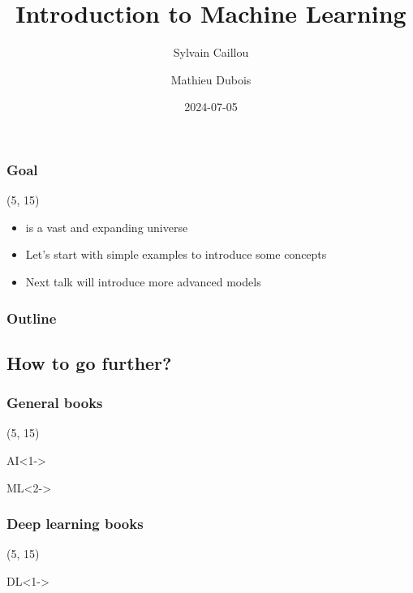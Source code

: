 \documentclass[10pt]{beamer}
\title{Introduction to Machine Learning}
\author{Sylvain Caillou \and Mathieu Dubois}
\institute{L2IT}
\date{2024-07-05}
\begin{document}
\frame{\titlepage}

\begin{frame}
  \frametitle{Goal}

  \begin{textblock}{90}(5, 15)
    \begin{itemize}
    \item {} is a vast and expanding universe
    \item Let's start with simple examples to introduce some concepts
    \item Next talk will introduce more advanced models
    \end{itemize}
  \end{textblock}
\end{frame}


\begin{frame}
  \frametitle{Outline}
  \tableofcontents[hidesubsections]
\end{frame}


\subsection*{How to go further?}

\begin{frame}
  \frametitle{General books}

  \nocite{*}

  \begin{textblock}{90}(5, 15)
    \begin{block}{AI}<1->
      \printbibliography[heading=none,category=AI]
    \end{block}

    \begin{block}{\ac{ML}}<2->
      \printbibliography[heading=none,category=ML]
    \end{block}
  \end{textblock}
\end{frame}

\begin{frame}
  \frametitle{Deep learning books}

  \nocite{*}

  \begin{textblock}{90}(5, 15)
    \begin{block}{DL}<1->
      \printbibliography[heading=none,category=deep_learning]
    \end{block}
  \end{textblock}
\end{frame}
\end{document}
